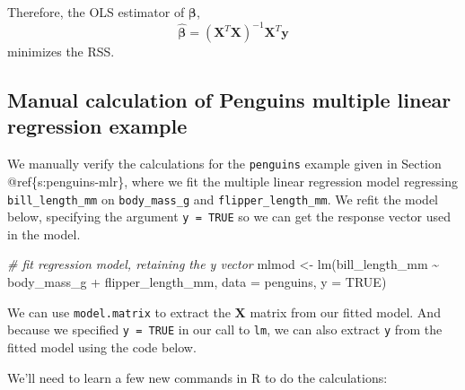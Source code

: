 \documentclass[
]{book}
\newenvironment{Shaded}{\begin{snugshade}}{\end{snugshade}}
\newcommand{\AttributeTok}[1]{\textcolor[rgb]{0.77,0.63,0.00}{#1}}
\newcommand{\CommentTok}[1]{\textcolor[rgb]{0.56,0.35,0.01}{\textit{#1}}}
\newcommand{\ConstantTok}[1]{\textcolor[rgb]{0.00,0.00,0.00}{#1}}
\newcommand{\FunctionTok}[1]{\textcolor[rgb]{0.00,0.00,0.00}{#1}}
\newcommand{\NormalTok}[1]{#1}
\newcommand{\OtherTok}[1]{\textcolor[rgb]{0.56,0.35,0.01}{#1}}
\newcommand{\SpecialCharTok}[1]{\textcolor[rgb]{0.00,0.00,0.00}{#1}}
\theoremstyle{definition}
\theoremstyle{definition}
\theoremstyle{definition}
\theoremstyle{definition}
\theoremstyle{remark}
\begin{document}
Therefore, the OLS estimator of \(\boldsymbol{\beta}\),
\[\hat{\boldsymbol{\beta}}=(\mathbf{X}^T\mathbf{X})^{-1}\mathbf{X}^T\mathbf{y}\]
minimizes the RSS.

\hypertarget{manual-calculation-of-penguins-multiple-linear-regression-example}{%
\subsection{Manual calculation of Penguins multiple linear regression example}\label{manual-calculation-of-penguins-multiple-linear-regression-example}}

We manually verify the calculations for the \texttt{penguins} example given in Section @ref\{s:penguins-mlr\}, where we fit the multiple linear regression model regressing \texttt{bill\_length\_mm} on \texttt{body\_mass\_g} and \texttt{flipper\_length\_mm}. We refit the model below, specifying the argument \texttt{y\ =\ TRUE} so we can get the response vector used in the model.

\begin{Shaded}
\begin{Highlighting}[]
\CommentTok{\# fit regression model, retaining the y vector}
\NormalTok{mlmod }\OtherTok{\textless{}{-}} \FunctionTok{lm}\NormalTok{(bill\_length\_mm }\SpecialCharTok{\textasciitilde{}}\NormalTok{ body\_mass\_g }\SpecialCharTok{+}\NormalTok{ flipper\_length\_mm,}
            \AttributeTok{data =}\NormalTok{ penguins, }\AttributeTok{y =} \ConstantTok{TRUE}\NormalTok{)}
\end{Highlighting}
\end{Shaded}

We can use \texttt{model.matrix} to extract the \(\mathbf{X}\) matrix from our fitted model. And because we specified \texttt{y\ =\ TRUE} in our call to \texttt{lm}, we can also extract \texttt{y} from the fitted model using the code below.

\begin{Shaded}
\end{Shaded}

We'll need to learn a few new commands in R to do the calculations:
\end{document}
